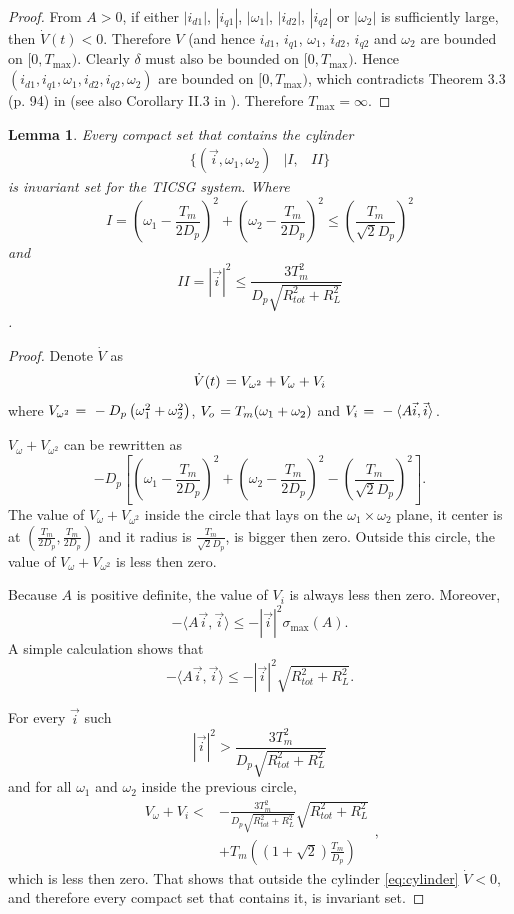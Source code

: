 \documentclass[letterpaper,10pt,conference]{ieeeconf}
\newtheorem{lemma}[theorem]{Lemma}
\renewcommand{\o}    {{\omega}}
\newcommand{\m}      {{\hbox{\hskip 1pt}}}
\begin{document}
\begin{proof}
From $A>0$, if either $|i_{d1}|$, $|i_{q1}|$, $|\o_1|$, $|i_{d2}|$,
$|i_{q2}|$ or $|\o_2|$ is sufficiently large, then
$\dot{V}(t)<0$. Therefore $V$ (and hence $i_{d1}$, $i_{q1}$, $\o_1$,
$i_{d2}$, $i_{q2}$ and $\o_2$ are bounded on $[0,{T_{\max}})$. Clearly
$\delta$ must also be bounded on $[0,{T_{\max}})$. Hence $(i_{d1},
i_{q1},\o_1,i_{d2},i_{q2},\o_2)$ are bounded on $[0,{T_{\max}})$, which
contradicts Theorem 3.3 (p. 94) in \cite{Khalil} (see also Corollary 
II.3 in \cite{JayWeissBS:09}). Therefore ${T_{\max}}=\infty$.
\end{proof}

\begin{lemma}\label{lemma:invariantSet}
Every compact set that contains the cylinder 
\begin{equation}
\begin{aligned}
\{\left(\vec{i},\o_1,\o_2 \right) &\mid  I
,&II \}
\end{aligned}
\label{eq:cylinder}
\end{equation}
 is invariant set for the TICSG system. Where $$I = \left(\o_1-\frac{T_m}{2D_p}\right)^2+ \left(\o_2-\frac{T_m}{2D_p}\right)^2\le\left( \frac{T_m}{\sqrt{2} D_p}\right)^2$$ and $$II=|\vec{i}|^2\le\frac{3 T_m^2}{D_p \sqrt{R_{tot}^2+R_L^2}}$$.
\end{lemma}

\begin{proof} 
Denote $\dot{V}$ as $$ \dot{V}(t) \m=V_{\o^2}+V_\o + V_i$$ 
where  $ V_{\o^2}\m=\m -D_p\left( \o_1^2+\o_2^2\right)$, $ V_o\m=T_m(\o_1+\o_2)$ and 
$  V_i \m=\m -\langle A\vec{i},\vec{i} \rangle \m$. 

$V_\o+V_{\o^2}$ can be rewritten as 
$$-D_p\left[\left(\o_1-\frac{T_m}{2D_p}\right)^2+ \left(\o_2-\frac{T_m}{2D_p}\right)^2-\left( \frac{T_m}{\sqrt{2} D_p}\right)^2\right].$$ 
The value of $V_\o+V_{\o^2}$ inside the circle that lays on the $\o_1\times \o_2$ plane, it center is at $\left(\frac{T_m}{2D_p},\frac{T_m}{2D_p} \right)$ and it radius is $\frac{T_m}{\sqrt{2} D_p}$, is bigger then zero. Outside this circle, the value of  $V_\o+V_{\o^2}$ is less then zero.

Because $A$ is positive definite, the value of $V_i$ is always less then zero. Moreover, 
$$
-\langle A\vec{i},\vec{i} \rangle  \le -|\vec{i}|^2 \sigma_{\max}(A).
$$
A simple calculation shows that 
$$
-\langle A\vec{i},\vec{i} \rangle  \le -|\vec{i}|^2 \sqrt{R_{tot}^2+R_L^2}.
$$

For every $\vec{i}$ such 
$$
|\vec{i}|^2>\frac{3 T_m^2}{D_p \sqrt{R_{tot}^2+R_L^2}}
$$
 and for all $\o_1$ and $\o_2$ inside  the previous circle, 
 $$ 
 \begin{aligned}
 V_\o+V_i <& -\frac{3 T_m^2}{D_p \sqrt{R_{tot}^2+R_L^2}} \sqrt{R_{tot}^2+R_L^2}\\&+T_m\left((1+\sqrt{2}) \frac{T_m}{D_p} \right)
 \end{aligned},
 $$
 which is less then zero. That shows that outside the cylinder \eqref{eq:cylinder} $\dot{V}<0$, and therefore every compact set that contains it, is invariant set.  
 \end{proof}
 
\end{document}
